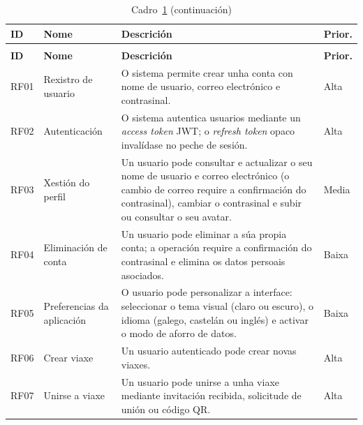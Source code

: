 \begin{longtable}{@{}p{1.2cm}>{\raggedright\arraybackslash}p{3cm}p{8.5cm}p{1.5cm}@{}}
  \caption{Requisitos funcionais da aplicación.}
  \label{tab:requisitos-funcionais} \\
  \toprule
  \textbf{ID} & \textbf{Nome} & \textbf{Descrición} & \textbf{Prior.} \\
  \midrule
  \endfirsthead
  \caption*{Cadro~\ref{tab:requisitos-funcionais} (continuación)} \\
  \toprule
  \textbf{ID} & \textbf{Nome} & \textbf{Descrición} & \textbf{Prior.} \\
  \midrule
  \endhead
  RF01 & Rexistro de usuario        & O sistema permite crear unha conta con nome de usuario, correo electrónico e contrasinal.                                                                                        & Alta   \\[4pt]
  RF02 & Autenticación              & O sistema autentica usuarios mediante un \textit{access token} JWT; o \textit{refresh token} opaco invalídase no peche de sesión.                                                  & Alta   \\[4pt]
  RF03 & Xestión do perfil          & Un usuario pode consultar e actualizar o seu nome de usuario e correo electrónico (o cambio de correo require a confirmación do contrasinal), cambiar o contrasinal e subir ou consultar o seu avatar. & Media  \\[4pt]
  RF04 & Eliminación de conta       & Un usuario pode eliminar a súa propia conta; a operación require a confirmación do contrasinal e elimina os datos persoais asociados.                                               & Baixa  \\[4pt]
  RF05 & Preferencias da aplicación & O usuario pode personalizar a interface: seleccionar o tema visual (claro ou escuro), o idioma (galego, castelán ou inglés) e activar o modo de aforro de datos.                    & Baixa  \\[4pt]
  RF06 & Crear viaxe                & Un usuario autenticado pode crear novas viaxes.                                                                                                                                     & Alta   \\[4pt]
  RF07 & Unirse a viaxe             & Un usuario pode unirse a unha viaxe mediante invitación recibida, solicitude de unión ou código QR.                                                                                 & Alta   \\[4pt]

\end{longtable}
